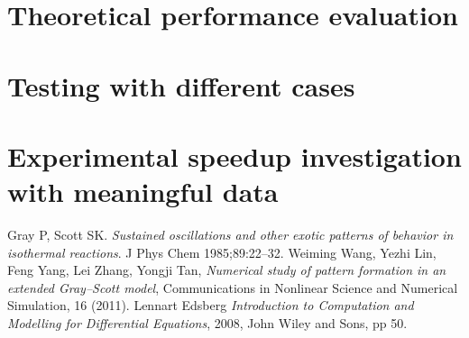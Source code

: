 \documentclass[a4paper,11pt]{article}
\begin{document}
\section*{Theoretical performance evaluation}
\section*{Testing with different cases}
\section*{Experimental speedup investigation with meaningful data}

\begin{thebibliography}{}
 Gray P, Scott SK. {\it Sustained oscillations and other exotic patterns of behavior in isothermal reactions}. J Phys Chem 1985;89:22–32.
 Weiming Wang, Yezhi Lin, Feng Yang, Lei Zhang, Yongji Tan, {\it Numerical study of pattern formation in an extended Gray–Scott model}, Communications in Nonlinear Science and Numerical Simulation, 16 (2011).
 Lennart Edsberg {\it Introduction to Computation and Modelling for Differential Equations}, 2008, John Wiley and Sons, pp 50.
\end{thebibliography}
\end{document}
